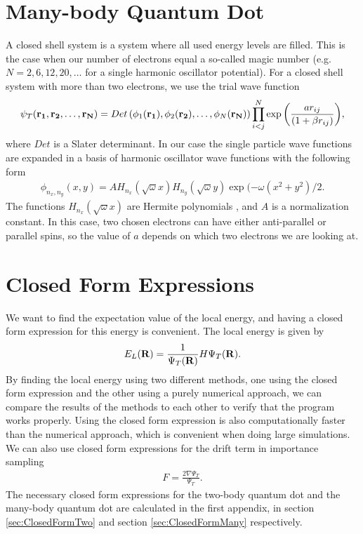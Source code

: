 \documentclass[../main.tex]{subfiles}
\begin{document}
\section{Many-body Quantum Dot}
A closed shell system is a system where all used energy levels are filled. This is the case when our number of electrons equal a so-called magic number (e.g. $N=2,6,12,20,\dots$ for a single harmonic oscillator potential). For a closed shell system with more than two electrons, we use the trial wave function \cite{FYS4411-LectureNotes}
\begin{align}
    \psi_{T}({\bf r_1},{\bf r_2},\dots, {\bf r_N}) = 
   Det\left(\phi_{1}({\bf r_1}),\phi_{2}({\bf r_2}),
   \dots,\phi_{N}({\bf r_N})\right)
   \prod_{i<j}^{N}\exp{\left(\frac{a r_{ij}}{(1+\beta r_{ij})}\right)}, 
\end{align}
where $Det$ is a Slater determinant. In our case the single particle wave functions are expanded in a basis of harmonic oscillator wave functions with the following form\cite{FYS4411-LectureNotes}
\begin{align}\label{eq: HO SPWF}
    \phi_{n_x,n_y}(x,y) = A H_{n_x}(\sqrt{\omega}x)H_{n_y}(\sqrt{\omega}y)\exp{(-\omega(x^2+y^2)/2}.
\end{align}
The functions $H_{n_x}(\sqrt{\omega}x)$ are Hermite polynomials \cite{Hermite}, and $A$ is a normalization constant. In this case, two chosen electrons can have either anti-parallel or parallel spins, so the value of $a$ depends on which two electrons we are looking at.

\section{Closed Form Expressions}\label{sec:CF}
We want to find the expectation value of the local energy, and having a closed form expression for this energy is convenient. The local energy is given by \cite{FYS4411-LectureNotes}
\begin{align}\label{eq: E_L}
    E_L({\bf R})=\frac{1}{\Psi_T({\bf R})}H\Psi_T({\bf R}).
\end{align}
By finding the local energy using two different methods, one using the closed form expression and the other using a purely numerical approach, we can compare the results of the methods to each other to verify that the program works properly. Using the closed form expression is also computationally faster than the numerical approach, which is convenient when doing large simulations. We can also use closed form expressions for the drift term in importance sampling \cite{FYS4411-LectureNotes}
\begin{align}
    F = \frac{2\nabla \Psi_T}{\Psi_T}.    
\end{align}
The necessary closed form expressions for the two-body quantum dot and the many-body quantum dot are calculated in the first appendix, in section \ref{sec:ClosedFormTwo} and section \ref{sec:ClosedFormMany} respectively.
\end{document}
